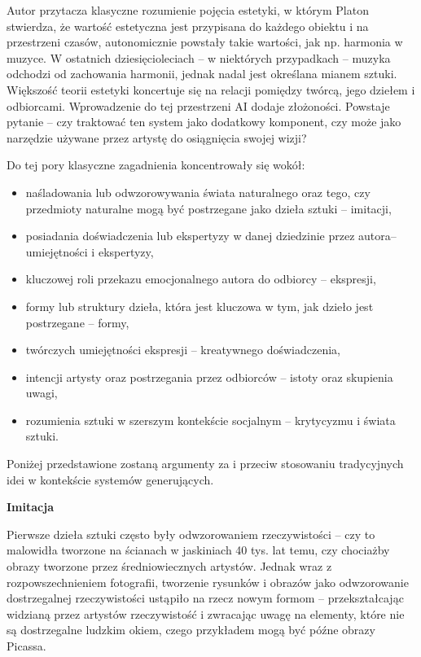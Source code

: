 \documentclass[12pt]{article}
\begin{document}
Autor przytacza klasyczne rozumienie pojęcia estetyki, w którym Platon stwierdza, że wartość estetyczna jest przypisana do każdego obiektu i na przestrzeni czasów, autonomicznie powstały takie wartości, jak np. harmonia w muzyce. W ostatnich dziesięcioleciach – w niektórych przypadkach – muzyka odchodzi od zachowania harmonii, jednak nadal jest określana mianem sztuki. Większość teorii estetyki koncertuje się na relacji pomiędzy twórcą, jego dziełem i odbiorcami. Wprowadzenie do tej przestrzeni AI dodaje złożoności. Powstaje pytanie – czy traktować ten system jako dodatkowy komponent, czy może jako narzędzie używane przez artystę do osiągnięcia swojej wizji?

Do tej pory klasyczne zagadnienia koncentrowały się wokół:

\begin{itemize}
    \item naśladowania lub odwzorowywania świata naturalnego oraz tego, czy przedmioty naturalne mogą być postrzegane jako dzieła sztuki – imitacji,
    \item posiadania doświadczenia lub ekspertyzy w danej dziedzinie przez autora– umiejętności i ekspertyzy,
    \item kluczowej roli przekazu emocjonalnego autora do odbiorcy – ekspresji,
    \item formy lub struktury dzieła, która jest kluczowa w tym, jak dzieło jest postrzegane – formy,
    \item twórczych umiejętności ekspresji – kreatywnego doświadczenia,
    \item intencji artysty oraz postrzegania przez odbiorców – istoty oraz skupienia uwagi,
    \item rozumienia sztuki w szerszym kontekście socjalnym – krytycyzmu i świata sztuki.
\end{itemize}

Poniżej przedstawione zostaną argumenty za i przeciw stosowaniu tradycyjnych idei w kontekście systemów generujących.

\noindent\textbf{Imitacja}

Pierwsze dzieła sztuki często były odwzorowaniem rzeczywistości – czy to malowidła tworzone na ścianach w jaskiniach 40 tys. lat temu, czy chociażby obrazy tworzone przez średniowiecznych artystów. Jednak wraz z rozpowszechnieniem fotografii, tworzenie rysunków i obrazów jako odwzorowanie dostrzegalnej rzeczywistości ustąpiło na rzecz nowym formom – przekształcając widzianą przez artystów rzeczywistość i zwracając uwagę na elementy, które nie są dostrzegalne ludzkim okiem, czego przykładem mogą być późne obrazy Picassa.
\end{document}
